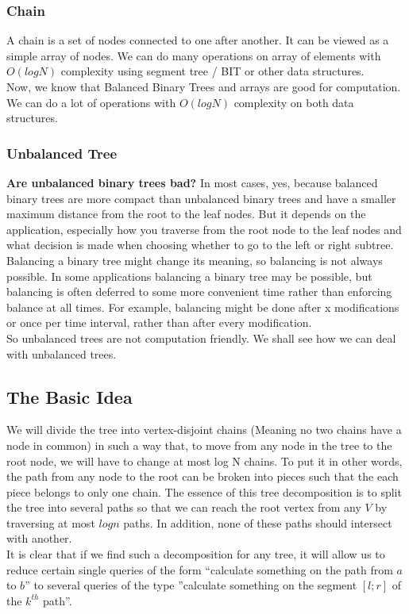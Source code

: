 \documentclass[12pt]{article}
\begin{document}
\subsubsection*{Chain}
A chain is a set of nodes connected to one after another. It can be viewed as a simple array of nodes. We can do many operations on array of elements with $O( log N )$ complexity using segment tree / BIT or other data structures. \\
Now, we know that Balanced Binary Trees and arrays are good for computation. We can do a lot of operations with $O( log N )$ complexity on both data structures.
\subsubsection*{Unbalanced Tree}
\textbf{Are unbalanced binary trees bad?} In most cases, yes, because balanced binary trees are more compact than unbalanced binary trees and have a smaller maximum distance from the root to the leaf nodes. But it depends on the application, especially how you traverse from the root node to the leaf nodes and what decision is made when choosing whether to go to the left or right subtree. Balancing a binary tree might change its meaning, so balancing is not always possible. In some applications balancing a binary tree may be possible, but balancing is often deferred to some more convenient time rather than enforcing balance at all times. For example, balancing might be done after x modifications or once per time interval, rather than after every modification.\\
So unbalanced trees are not computation friendly. We shall see how we can deal with unbalanced trees. \\
\subsection{The Basic Idea}
We will divide the tree into vertex-disjoint chains (Meaning no two chains have a node in common) in such a way that, to move from any node in the tree to the root node, we will have to change at most log N chains. To put it in other words, the path from any node to the root can be broken into pieces such that the each piece belongs to only one chain. The essence of this tree decomposition is to split the tree into several paths so that we can reach the root vertex from any $V$ by traversing at most $log n$ paths. In addition, none of these paths should intersect with another.\\
It is clear that if we find such a decomposition for any tree, it will allow us to reduce certain single queries of the form “calculate something on the path from $a$ to $b$” to several queries of the type ”calculate something on the segment $[l;r]$ of the $k^{th}$ path”.
\end{document}
